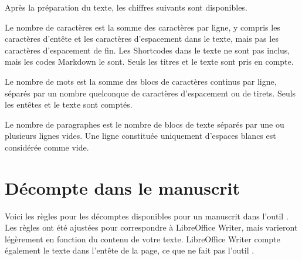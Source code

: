 \documentclass[a4paper,11pt,french]{sphinxmanual}
\begin{document}
\sphinxAtStartPar
Après la préparation du texte, les chiffres suivants sont disponibles.
\begin{description}
\sphinxAtStartPar
Le nombre de caractères est la somme des caractères par ligne, y compris les caractères d’en\sphinxhyphen{}tête et les caractères d’espacement dans le texte, mais pas les caractères d’espacement de fin. Les Shortcodes dans le texte ne sont pas inclus, mais les codes Markdown le sont. Seuls les titres et le texte sont pris en compte.

\sphinxAtStartPar
Le nombre de mots est la somme des blocs de caractères continus par ligne, séparés par un nombre quelconque de caractères d’espacement ou de tirets. Seuls les en\sphinxhyphen{}têtes et le texte sont comptés.

\sphinxAtStartPar
Le nombre de paragraphes est le nombre de blocs de texte séparés par une ou plusieurs lignes vides. Une ligne constituée uniquement d’espaces blancs est considérée comme vide.

\end{description}


\section{Décompte dans le manuscrit}
\label{\detokenize{more_counting:manuscript-counts}}
\sphinxAtStartPar
Voici les règles pour les décomptes disponibles pour un manuscrit dans l’outil . Les règles ont été ajustées pour correspondre à LibreOffice Writer, mais varieront légèrement en fonction du contenu de votre texte. LibreOffice Writer compte également le texte dans l’en\sphinxhyphen{}tête de la page, ce que ne fait pas l’outil .
\end{document}
